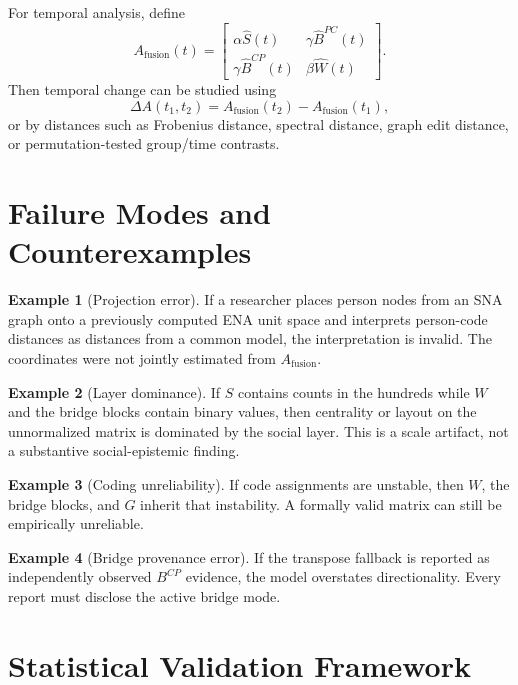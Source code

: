 \documentclass[11pt]{article}
\theoremstyle{definition}
\newtheorem{example}{Example}
\newcommand{\Af}{A_{\mathrm{fusion}}}
\begin{document}
For temporal analysis, define
\[
\Af(t)=
\begin{bmatrix}
\alpha\widehat S(t) & \gamma\widehat B^{PC}(t)\\
\gamma\widehat B^{CP}(t) & \beta\widehat W(t)
\end{bmatrix}.
\]
Then temporal change can be studied using
\[
\Delta A(t_1,t_2)=\Af(t_2)-\Af(t_1),
\]
or by distances such as Frobenius distance, spectral distance, graph edit
distance, or permutation-tested group/time contrasts.

\section{Failure Modes and Counterexamples}

\begin{example}[Projection error]
If a researcher places person nodes from an SNA graph onto a previously
computed ENA unit space and interprets person-code distances as distances from
a common model, the interpretation is invalid. The coordinates were not jointly
estimated from \(\Af\).
\end{example}

\begin{example}[Layer dominance]
If \(S\) contains counts in the hundreds while \(W\) and the bridge blocks contain binary
values, then centrality or layout on the unnormalized matrix is dominated by
the social layer. This is a scale artifact, not a substantive social-epistemic
finding.
\end{example}

\begin{example}[Coding unreliability]
If code assignments are unstable, then \(W\), the bridge blocks, and \(G\) inherit that
instability. A formally valid matrix can still be empirically unreliable.
\end{example}

\begin{example}[Bridge provenance error]
If the transpose fallback is reported as independently observed \(B^{CP}\)
evidence, the model overstates directionality. Every report must disclose the
active bridge mode.
\end{example}

\section{Statistical Validation Framework}
\end{document}
